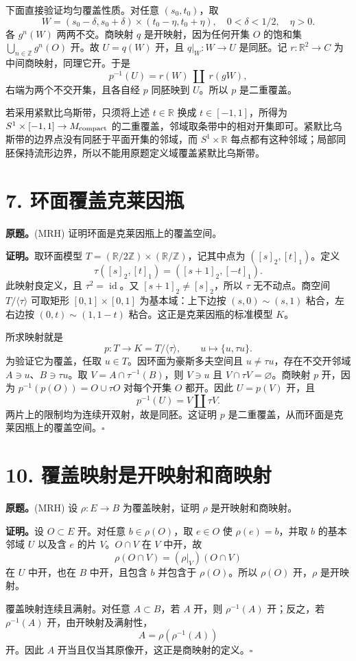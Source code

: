 \documentclass[UTF8,11pt,a4paper]{ctexart}
\newcommand{\R}{\mathbb R}\newcommand{\Z}{\mathbb Z}\newcommand{\C}{\mathbb C}
\newcommand{\pf}{\par\noindent\textbf{证明。}}
\begin{document}
下面直接验证均匀覆盖性质。对任意 $(s_0,t_0)$，取
\[W=(s_0-\delta,s_0+\delta)\times(t_0-\eta,t_0+\eta),\quad 0<\delta<1/2,\quad\eta>0.\]
各 $g^n(W)$ 两两不交。商映射 $q$ 是开映射，因为任何开集 $O$ 的饱和集 $\bigcup_{n\in\Z}g^n(O)$ 开。故 $U=q(W)$ 开，且 $q|_W:W\to U$ 是同胚。记 $r:\R^2\to C$ 为中间商映射，同理它开。于是
\[p^{-1}(U)=r(W)\ \coprod\ r(gW),\]
右端为两个不交开集，且各自经 $p$ 同胚映到 $U$。所以 $p$ 是二重覆盖。

若采用紧默比乌斯带，只须将上述 $t\in\R$ 换成 $t\in[-1,1]$，所得为 $S^1\times[-1,1]\to M_{\rm compact}$ 的二重覆盖，邻域取条带中的相对开集即可。紧默比乌斯带的边界点没有同胚于平面开集的邻域，而 $S^1\times\R$ 每点都有这种邻域；局部同胚保持流形边界，所以不能用原题定义域覆盖紧默比乌斯带。

\section*{7. 环面覆盖克莱因瓶}
\textbf{原题。}(MRH) 证明环面是克莱因瓶上的覆盖空间。
\pf 取环面模型 $T=(\R/2\Z)\times(\R/\Z)$，记其中点为 $([s]_2,[t]_1)$。定义
\[\tau([s]_2,[t]_1)=([s+1]_2,[-t]_1).\]
此映射良定义，且 $\tau^2=\operatorname{id}$。又 $[s+1]_2\ne[s]_2$，所以 $\tau$ 无不动点。商空间 $T/\langle\tau\rangle$ 可取矩形 $[0,1]\times[0,1]$ 为基本域：上下边按 $(s,0)\sim(s,1)$ 粘合，左右边按 $(0,t)\sim(1,1-t)$ 粘合。这正是克莱因瓶的标准模型 $K$。

所求映射就是
\[p:T\longrightarrow K=T/\langle\tau\rangle,\qquad u\longmapsto\{u,\tau u\}.\]
为验证它为覆盖，任取 $u\in T$。因环面为豪斯多夫空间且 $u\ne\tau u$，存在不交开邻域 $A\ni u$、$B\ni\tau u$。取 $V=A\cap\tau^{-1}(B)$，则 $V\ni u$ 且 $V\cap\tau V=\varnothing$。商映射 $p$ 开，因为 $p^{-1}(p(O))=O\cup\tau O$ 对每个开集 $O$ 都开。因此 $U=p(V)$ 开，且
\[p^{-1}(U)=V\coprod\tau V.\]
两片上的限制均为连续开双射，故是同胚。这证明 $p$ 是二重覆盖，从而环面是克莱因瓶上的覆盖空间。\hfill$\square$

\section*{10. 覆盖映射是开映射和商映射}
\textbf{原题。}(MRH) 设 $\rho:E\to B$ 为覆盖映射，证明 $\rho$ 是开映射和商映射。
\pf 设 $O\subset E$ 开。对任意 $b\in\rho(O)$，取 $e\in O$ 使 $\rho(e)=b$，并取 $b$ 的基本邻域 $U$ 以及含 $e$ 的片 $V$。$O\cap V$ 在 $V$ 中开，故
\[\rho(O\cap V)=(\rho|_V)(O\cap V)\]
在 $U$ 中开，也在 $B$ 中开，且包含 $b$ 并包含于 $\rho(O)$。所以 $\rho(O)$ 开，$\rho$ 是开映射。

覆盖映射连续且满射。对任意 $A\subset B$，若 $A$ 开，则 $\rho^{-1}(A)$ 开；反之，若 $\rho^{-1}(A)$ 开，由开映射及满射性，
\[A=\rho(\rho^{-1}(A))\]
开。因此 $A$ 开当且仅当其原像开，这正是商映射的定义。\hfill$\square$
\end{document}
